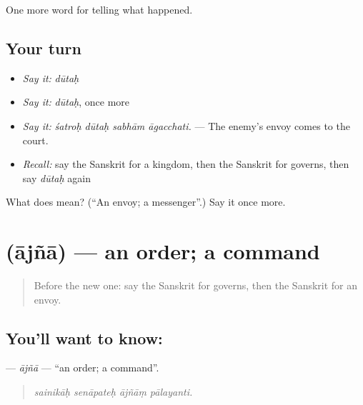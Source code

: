 \begin{grammarlens}[title={What you've built}]
One more word for telling what happened.
\end{grammarlens}

\subsection*{Your turn}
\begin{itemize}
\raggedright
  \item \emph{Say it:} \emph{dūtaḥ}
  \item \emph{Say it:} \emph{dūtaḥ}, once more
  \item \emph{Say it:} \emph{śatroḥ dūtaḥ sabhām āgacchati.} — The enemy's envoy comes to the court.
  \item \emph{Recall:} say the Sanskrit for a kingdom, then the Sanskrit for governs, then say \emph{dūtaḥ} again
\end{itemize}

\begin{tcolorbox}[breakable,colback=teal!4,colframe=teal!35!black,title={Before you move on}]
What does  mean? (\textquotedblleft{}An envoy; a messenger\textquotedblright{}.) Say it once more.
\end{tcolorbox}
\section[\texorpdfstring{\sk{आज्ञा} (ājñā)}{आज्ञा (ājñā)}]{ (ājñā) — an order; a command}

\label{lesson:SA-C317-ajna}



\begin{quote}
Before the new one: say the Sanskrit for governs, then the Sanskrit for an envoy.
\end{quote}

\subsection*{You'll want to know: }
\textbf{} — \emph{ājñā} — \textquotedblleft{}an order; a command\textquotedblright{}.

\begin{quote}
   
\end{quote}

\begin{quote}
\emph{sainikāḥ senāpateḥ ājñāṃ pālayanti.}
\end{quote}

